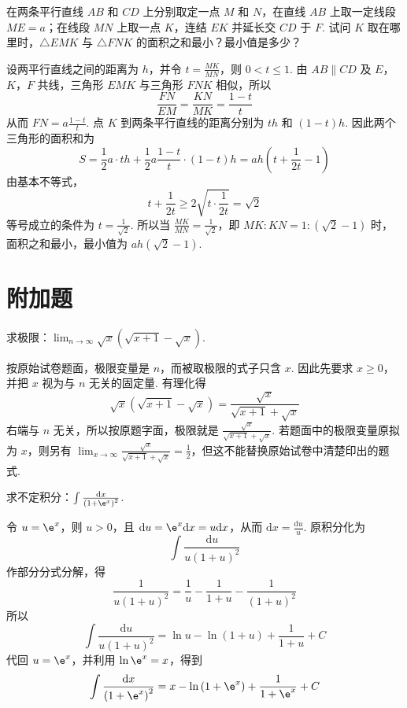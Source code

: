 \begin{problem}
在两条平行直线 \(AB\) 和 \(CD\) 上分别取定一点 \(M\) 和 \(N\)，在直线 \(AB\) 上取一定线段 \( ME=a \)；在线段 \(MN\) 上取一点 \(K\)，连结 \(EK\) 并延长交 \(CD\) 于 \(F\). 试问 \(K\) 取在哪里时，\( \triangle EMK \) 与 \( \triangle FNK \) 的面积之和最小？最小值是多少？
\end{problem}

\begin{solution}
设两平行直线之间的距离为 \(h\)，并令 \(t=\frac{MK}{MN}\)，则 \(0<t\leqslant1\). 由 \(AB\parallel CD\) 及 \(E\)，\(K\)，\(F\) 共线，三角形 \(EMK\) 与三角形 \(FNK\) 相似，所以
\[
\frac{FN}{EM}=\frac{KN}{MK}=\frac{1-t}{t}
\]
从而 \(FN=a\frac{1-t}{t}\). 点 \(K\) 到两条平行直线的距离分别为 \(th\) 和 \((1-t)h\). 因此两个三角形的面积和为
\[
S=\frac{1}{2}a\cdot th+\frac{1}{2}a\frac{1-t}{t}\cdot(1-t)h
=ah\left(t+\frac{1}{2t}-1\right)
\]
由基本不等式，
\[
t+\frac{1}{2t}\geqslant2\sqrt{t\cdot\frac{1}{2t}}=\sqrt{2}
\]
等号成立的条件为 \(t=\frac{1}{\sqrt{2}}\). 所以当 \(\frac{MK}{MN}=\frac{1}{\sqrt{2}}\)，即 \(MK:KN=1:(\sqrt{2}-1)\) 时，面积之和最小，最小值为 \(ah(\sqrt{2}-1)\).
\end{solution}

\section{附加题}

\begin{problem}
求极限：\( \displaystyle\lim_{n\to\infty}\sqrt{x}\left( \sqrt{x+1}-\sqrt{x} \right) \).
\end{problem}

\begin{solution}
按原始试卷题面，极限变量是 \(n\)，而被取极限的式子只含 \(x\). 因此先要求 \(x\geqslant0\)，并把 \(x\) 视为与 \(n\) 无关的固定量. 有理化得
\[
\sqrt{x}\left(\sqrt{x+1}-\sqrt{x}\right)=\frac{\sqrt{x}}{\sqrt{x+1}+\sqrt{x}}
\]
右端与 \(n\) 无关，所以按原题字面，极限就是 \(\frac{\sqrt{x}}{\sqrt{x+1}+\sqrt{x}}\). 若题面中的极限变量原拟为 \(x\)，则另有 \(\displaystyle\lim_{x\to\infty}\frac{\sqrt{x}}{\sqrt{x+1}+\sqrt{x}}=\frac{1}{2}\)，但这不能替换原始试卷中清楚印出的题式.
\end{solution}

\begin{problem}
求不定积分：\( \int \frac{\mathrm{d}x}{\left( 1+\e^x \right)^2} \).
\end{problem}

\begin{solution}
令 \(u=\e^x\)，则 \(u>0\)，且 \(\mathrm{d}u=\e^x\mathrm{d}x=u\mathrm{d}x\)，从而 \(\mathrm{d}x=\frac{\mathrm{d}u}{u}\). 原积分化为
\[
\int\frac{\mathrm{d}u}{u(1+u)^2}
\]
作部分分式分解，得
\[
\frac{1}{u(1+u)^2}=\frac{1}{u}-\frac{1}{1+u}-\frac{1}{(1+u)^2}
\]
所以
\[
\int\frac{\mathrm{d}u}{u(1+u)^2}=\ln u-\ln(1+u)+\frac{1}{1+u}+C
\]
代回 \(u=\e^x\)，并利用 \(\ln\e^x=x\)，得到
\[
\int\frac{\mathrm{d}x}{\left(1+\e^x\right)^2}=x-\ln\left(1+\e^x\right)+\frac{1}{1+\e^x}+C
\]
\end{solution}
